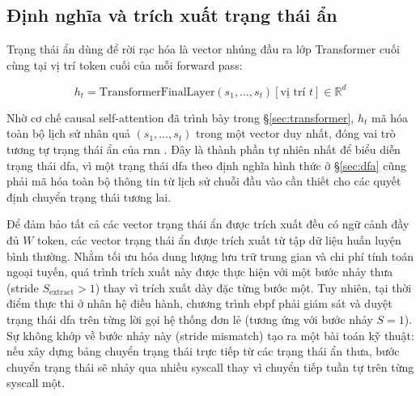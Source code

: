 \documentclass[../main.tex]{subfiles}
\begin{document}
\subsection{Định nghĩa và trích xuất trạng thái ẩn}
\label{sec:hidden_states}

Trạng thái ẩn dùng để rời rạc hóa là vector nhúng đầu ra lớp
Transformer cuối cùng tại
vị trí token cuối của mỗi forward pass:

\begin{equation}
  \label{eq:hidden_state}
  h_t = \text{TransformerFinalLayer}(s_1, \ldots, s_t)[\text{vị trí } t]
  \in \mathbb{R}^d
\end{equation}

Nhờ cơ chế causal self-attention đã trình bày trong
§\ref{sec:transformer}, $h_t$ mã hóa
toàn bộ lịch sử nhân quả $(s_1, \ldots, s_t)$ trong một vector duy
nhất, đóng vai trò
tương tự trạng thái ẩn của \gls{rnn} \cite{weiss2018extracting}. Đây là thành
phần tự nhiên nhất
để biểu diễn trạng thái \gls{dfa}, vì một trạng thái \gls{dfa} theo
định nghĩa hình thức ở
§\ref{sec:dfa} cũng phải mã hóa toàn bộ thông tin từ lịch sử chuỗi
đầu vào cần thiết
cho các quyết định chuyển trạng thái tương lai.

Để đảm bảo tất cả các vector trạng thái ẩn được trích xuất đều có ngữ
cảnh đầy đủ $W$
token, các vector trạng thái ẩn được trích xuất từ tập dữ liệu huấn
luyện bình thường. Nhằm tối ưu hóa dung lượng lưu trữ trung gian và
chi phí tính toán ngoại tuyến, quá trình trích xuất này được thực
hiện với một bước nhảy thưa (stride $S_{\text{extract}} > 1$) thay vì
trích xuất dày đặc từng bước một. Tuy nhiên, tại thời điểm thực thi ở
nhân hệ điều hành, chương trình \gls{ebpf} phải giám sát và duyệt trạng
thái \gls{dfa} trên từng lời gọi hệ thống đơn lẻ (tương ứng với bước nhảy
$S = 1$). Sự không khớp về bước nhảy này (stride mismatch) tạo ra một
bài toán kỹ thuật: nếu xây dựng bảng chuyển trạng thái trực tiếp từ
các trạng thái ẩn thưa, bước chuyển trạng thái sẽ nhảy qua nhiều
\gls{syscall} thay vì chuyển tiếp tuần tự trên từng \gls{syscall} một.
\end{document}
